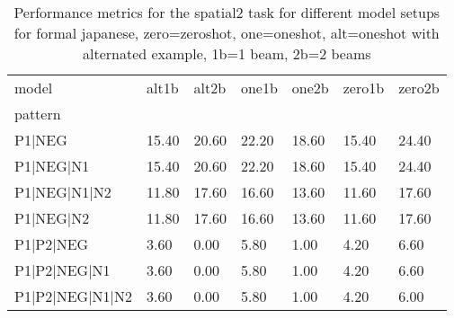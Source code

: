 \begin{table}[h]
\begin{tabular}{l|llllll}
\toprule
model & alt1b & alt2b & one1b & one2b & zero1b & zero2b \\
pattern &  &  &  &  &  &  \\
\midrule
P1|NEG & 15.40 & 20.60 & 22.20 & 18.60 & 15.40 & 24.40 \\
P1|NEG|N1 & 15.40 & 20.60 & 22.20 & 18.60 & 15.40 & 24.40 \\
P1|NEG|N1|N2 & 11.80 & 17.60 & 16.60 & 13.60 & 11.60 & 17.60 \\
P1|NEG|N2 & 11.80 & 17.60 & 16.60 & 13.60 & 11.60 & 17.60 \\
P1|P2|NEG & 3.60 & 0.00 & 5.80 & 1.00 & 4.20 & 6.60 \\
P1|P2|NEG|N1 & 3.60 & 0.00 & 5.80 & 1.00 & 4.20 & 6.60 \\
P1|P2|NEG|N1|N2 & 3.60 & 0.00 & 5.80 & 1.00 & 4.20 & 6.00 \\
\bottomrule
\end{tabular}
\caption{Performance metrics for the spatial2 task for different model setups for formal japanese, zero=zeroshot, one=oneshot, alt=oneshot with alternated example, 1b=1 beam, 2b=2 beams}
\label{tab:ja form_spatial2_performance}
\end{table}
